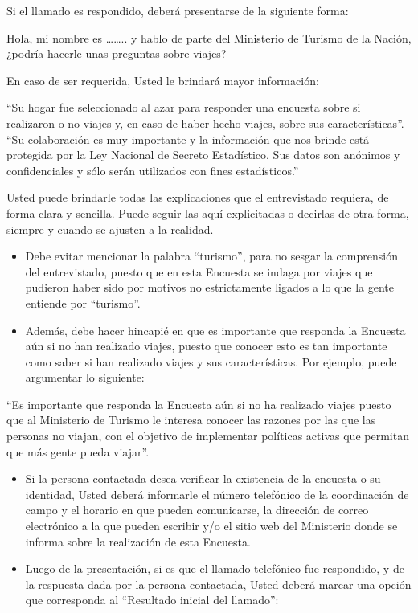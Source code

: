 \documentclass[
  openany]{book}
\begin{document}
Si el llamado es respondido, deberá presentarse de la siguiente forma:

Hola, mi nombre es \ldots\ldots.. y hablo de parte del Ministerio de Turismo de la Nación, ¿podría hacerle unas preguntas sobre viajes?

En caso de ser requerida, Usted le brindará mayor información:

``Su hogar fue seleccionado al azar para responder una encuesta sobre si realizaron o no viajes y, en caso de haber hecho viajes, sobre sus características''. ``Su colaboración es muy importante y la información que nos brinde está protegida por la Ley Nacional de Secreto Estadístico. Sus datos son anónimos y confidenciales y sólo serán utilizados con fines estadísticos.''

Usted puede brindarle todas las explicaciones que el entrevistado requiera, de forma clara y sencilla. Puede seguir las aquí explicitadas o decirlas de otra forma, siempre y cuando se ajusten a la realidad.

\begin{itemize}
\item
  Debe evitar mencionar la palabra ``turismo'', para no sesgar la comprensión del entrevistado, puesto que en esta Encuesta se indaga por viajes que pudieron haber sido por motivos no estrictamente ligados a lo que la gente entiende por ``turismo''.
\item
  Además, debe hacer hincapié en que es importante que responda la Encuesta aún si no han realizado viajes, puesto que conocer esto es tan importante como saber si han realizado viajes y sus características. Por ejemplo, puede argumentar lo siguiente:
\end{itemize}

``Es importante que responda la Encuesta aún si no ha realizado viajes puesto que al Ministerio de Turismo le interesa conocer las razones por las que las personas no viajan, con el objetivo de implementar políticas activas que permitan que más gente pueda viajar''.

\begin{itemize}
\item
  Si la persona contactada desea verificar la existencia de la encuesta o su identidad, Usted deberá informarle el número telefónico de la coordinación de campo y el horario en que pueden comunicarse, la dirección de correo electrónico a la que pueden escribir y/o el sitio web del Ministerio donde se informa sobre la realización de esta Encuesta.
\item
  Luego de la presentación, si es que el llamado telefónico fue respondido, y de la respuesta dada por la persona contactada, Usted deberá marcar una opción que corresponda al ``Resultado inicial del llamado'':
\end{itemize}
\end{document}
